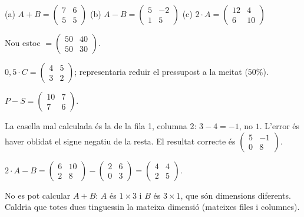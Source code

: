 \begin{solucions}
\begin{sollist}
  \item (a) $A+B=\begin{pmatrix} 7 & 6 \\ 5 & 5 \end{pmatrix}$ \quad
        (b) $A-B=\begin{pmatrix} 5 & -2 \\ 1 & 5 \end{pmatrix}$ \quad
        (c) $2\cdot A=\begin{pmatrix} 12 & 4 \\ 6 & 10 \end{pmatrix}$
  \item Nou estoc $=\begin{pmatrix} 50 & 40 \\ 50 & 30 \end{pmatrix}$.
  \item $0{,}5\cdot C=\begin{pmatrix} 4 & 5 \\ 3 & 2 \end{pmatrix}$;
        \;representaria reduir el pressupost a la meitat ($50\%$).
  \item $P-S=\begin{pmatrix} 10 & 7 \\ 7 & 6 \end{pmatrix}$.
  \item La casella mal calculada és la de la fila 1, columna 2: $3-4=-1$, no $1$.
        L'error és haver oblidat el signe negatiu de la resta. El resultat correcte
        és $\begin{pmatrix} 5 & -1 \\ 0 & 8 \end{pmatrix}$.
  \item $2\cdot A-B=\begin{pmatrix} 6 & 10 \\ 2 & 8 \end{pmatrix}-\begin{pmatrix} 2 & 6 \\ 0 & 3 \end{pmatrix}
        =\begin{pmatrix} 4 & 4 \\ 2 & 5 \end{pmatrix}$.
  \item No es pot calcular $A+B$: $A$ és $1\times 3$ i $B$ és $3\times 1$, que són
        dimensions diferents. Caldria que totes dues tinguessin la mateixa
        dimensió (mateixes files i columnes).
\end{sollist}
\end{solucions}
